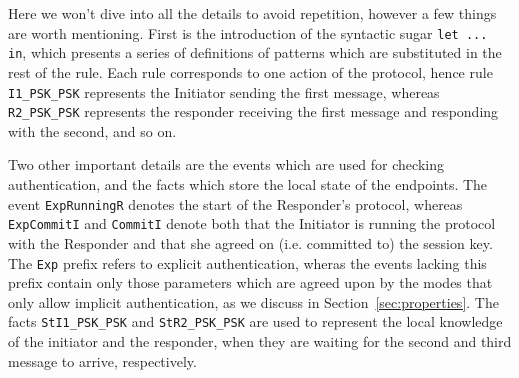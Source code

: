 Here we won't dive into all the details to avoid repetition, however a
few things are worth mentioning.  First is the introduction of the
syntactic sugar \lstinline{let ... in}, which presents a series of
definitions of patterns which are substituted in the rest of the
rule. Each rule corresponds to one action of the protocol, hence rule
\lstinline{I1_PSK_PSK} represents the Initiator sending the first
message, whereas \lstinline{R2_PSK_PSK} represents the responder
receiving the first message and responding with the second, and so on. 

Two other important details are the events which are used for checking
authentication, and the facts which store the local state of the
endpoints. 
%
The event \lstinline{ExpRunningR} denotes the start of the Responder's
protocol, whereas \lstinline{ExpCommitI} and \lstinline{CommitI}
denote both that the Initiator is running the protocol with the
Responder and that she agreed on (i.e. committed to) the session key.
%
The \lstinline{Exp} prefix refers to explicit authentication, wheras
the events lacking this prefix contain only those parameters which are
agreed upon by the modes that only allow implicit authentication, as
we discuss in Section~\ref{sec:properties}.
%
The facts \lstinline{StI1_PSK_PSK} and \lstinline{StR2_PSK_PSK} are
used to represent the local knowledge of the initiator and the
responder, when they are waiting for the second and third message to
arrive, respectively.



